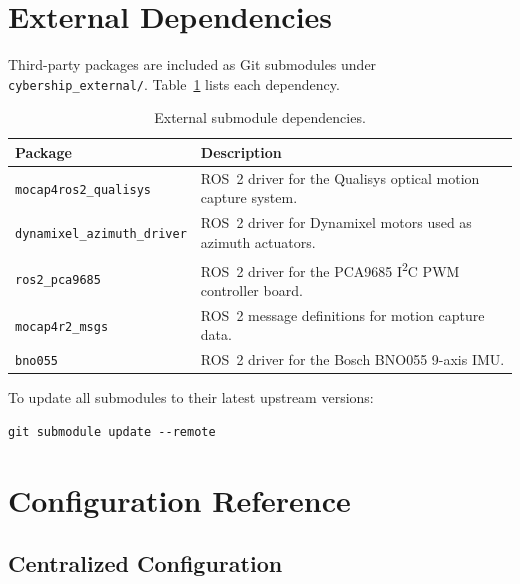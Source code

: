 \documentclass[12pt,a4paper]{article}
\begin{document}
	\section{External Dependencies}
	\label{sec:external}
	
	Third-party packages are included as Git submodules under \texttt{cybership\_external/}.
	Table~\ref{tab:external} lists each dependency.
	
	\begin{table}[ht]
		\centering
		\begin{tabular}{lp{9cm}}
			\toprule
			\textbf{Package}                    & \textbf{Description}                                                     \\
			\midrule
			\texttt{mocap4ros2\_qualisys}       & ROS~2 driver for the Qualisys optical motion capture system.             \\
			\texttt{dynamixel\_azimuth\_driver} & ROS~2 driver for Dynamixel motors used as azimuth actuators.             \\
			\texttt{ros2\_pca9685}              & ROS~2 driver for the PCA9685 I\textsuperscript{2}C PWM controller board. \\
			\texttt{mocap4r2\_msgs}             & ROS~2 message definitions for motion capture data.                       \\
			\texttt{bno055}                     & ROS~2 driver for the Bosch BNO055 9-axis IMU.                            \\
			\bottomrule
		\end{tabular}
		\caption{External submodule dependencies.}
		\label{tab:external}
	\end{table}
	
	To update all submodules to their latest upstream versions:
	
	\begin{lstlisting}[style=bash]
		git submodule update --remote
	\end{lstlisting}
	
	\section{Configuration Reference}
	\label{sec:config}
	
	\subsection{Centralized Configuration}
	
\end{document}
